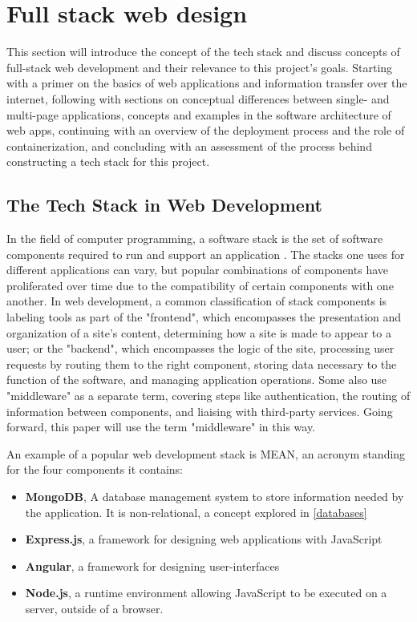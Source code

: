 \chapter{Full stack web design}\label{fullstack}

This section will introduce the concept of the tech stack and discuss concepts of full-stack web development and their relevance to this project's goals. Starting with a primer on the basics of web applications and information transfer over the internet, following with sections on conceptual differences between single- and multi-page applications, concepts and examples in the software architecture of web apps, continuing with an overview of the deployment process and the role of containerization, and concluding with an assessment of the process behind constructing a tech stack for this project.

\section{The Tech Stack in Web Development}

In the field of computer programming, a software stack is the set of software components required to run and support an application \cite{adedeji_full-stack_2023}. The stacks one uses for different applications can vary, but popular combinations of components have proliferated over time due to the compatibility of certain components with one another. In web development, a common classification of stack components is labeling tools as part of the "frontend", which encompasses the presentation and organization of a site's content, determining how a site is made to appear to a user; or the "backend", which encompasses the logic of the site, processing user requests by routing them to the right component, storing data necessary to the function of the software, and managing application operations. Some also use "middleware" as a separate term, covering steps like authentication, the routing of information between components, and liaising with third-party services. Going forward, this paper will use the term "middleware" in this way.

An example of a popular web development stack is MEAN, an acronym standing for the four components it contains:

\begin{itemize}
	\item \textbf{MongoDB}, A database management system to store information needed by the application. It is non-relational, a concept explored in \autoref{databases}
	\item \textbf{Express.js}, a framework for designing web applications with JavaScript
	\item \textbf{Angular}, a framework for designing user-interfaces
	\item \textbf{Node.js}, a runtime environment allowing JavaScript to be executed on a server, outside of a browser.
\end{itemize}

